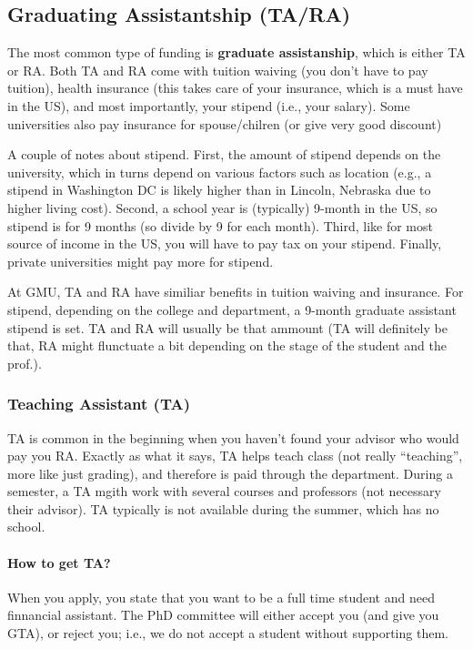 \documentclass[10pt]{article}
\begin{document}
\subsection{Graduating Assistantship (TA/RA)}
The most common type of funding is \textbf{graduate assistanship}, which is either TA or RA. Both TA and RA come with tuition waiving (you don't have to pay tuition), health insurance (this takes care of your insurance, which is a must have in the US), and most importantly, your stipend (i.e., your salary). Some universities also pay insurance for spouse/chilren (or give very good discount)

A couple of notes about stipend. First, the amount of stipend depends on the university, which in turns depend on various factors such as location (e.g., a stipend in Washington DC is likely higher than in Lincoln, Nebraska due to higher living cost). Second, a school year is (typically) 9-month in the US, so stipend is for 9 months (so divide by 9 for each month). Third, like for most source of income in the US, you will have to pay tax on your stipend. Finally, private universities might pay more for stipend.

\begin{tcolorbox}[left=1pt,right=1pt,top=1pt,bottom=1pt]
At GMU, TA and RA have similiar benefits in tuition waiving and insurance.  For stipend, depending on the college and department, a 9-month graduate assistant stipend is set.  TA and RA will usually be that ammount (TA will definitely be that, RA might flunctuate a bit depending on the stage of the student and the prof.). 
\end{tcolorbox}

\subsubsection{Teaching Assistant (TA)}

TA is common in the beginning when you haven't found your advisor who would pay you RA. Exactly as what it says, TA helps teach class (not really ``teaching'', more like just grading), and therefore is paid through the department.  During a semester, a TA mgith work with several courses and professors (not necessary their advisor).  TA typically is not available during the summer, which has no school.

\paragraph{How to get TA?}  When you apply, you state that you want to be a full time student and need finnancial assistant. The PhD committee will either accept you (and give you GTA), or reject you; i.e., we do not accept a student without supporting them.
\end{document}
